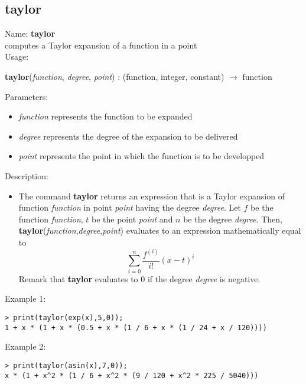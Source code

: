 \subsection{ taylor }
\noindent Name: \textbf{taylor}\\
computes a Taylor expansion of a function in a point\\

\noindent Usage: 
\begin{center}
\textbf{taylor}(\emph{function}, \emph{degree}, \emph{point}) : (\textsf{function}, \textsf{integer}, \textsf{constant}) $\rightarrow$ \textsf{function}\\
\end{center}
Parameters: 
\begin{itemize}
\item \emph{function} represents the function to be expanded
\item \emph{degree} represents the degree of the expansion to be delivered
\item \emph{point} represents the point in which the function is to be developped
\end{itemize}
\noindent Description: \begin{itemize}

\item The command \textbf{taylor} returns an expression that is a Taylor expansion
   of function \emph{function} in point \emph{point} having the degree \emph{degree}.
   Let $f$ be the function \emph{function}, $t$ be the point \emph{point} and
   $n$ be the degree \emph{degree}. Then, \textbf{taylor}(\emph{function},\emph{degree},\emph{point}) 
   evaluates to an expression mathematically equal to 
   $$\sum\limits_{i=0}^n \frac{f^{(i)}}{i!} \left(x - t \right)^i$$
   Remark that \textbf{taylor} evaluates to $0$ if the degree \emph{degree} is negative.
\end{itemize}
\noindent Example 1: 
\begin{center}\begin{minipage}{15cm}\begin{Verbatim}[frame=single]
> print(taylor(exp(x),5,0));
1 + x * (1 + x * (0.5 + x * (1 / 6 + x * (1 / 24 + x / 120))))
\end{Verbatim}
\end{minipage}\end{center}
\noindent Example 2: 
\begin{center}\begin{minipage}{15cm}\begin{Verbatim}[frame=single]
> print(taylor(asin(x),7,0));
x * (1 + x^2 * (1 / 6 + x^2 * (9 / 120 + x^2 * 225 / 5040)))
\end{Verbatim}
\end{minipage}\end{center}
